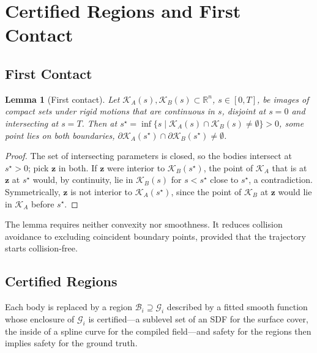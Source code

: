 \documentclass[journal]{IEEEtran}
\newtheorem{lemma}{Lemma}
\theoremstyle{definition}
\newcommand{\R}{\mathbb{R}}
\begin{document}
\section{Certified Regions and First Contact}\label{sec:regions}

\subsection{First Contact}
\begin{lemma}[First contact]\label{lem:contact}
Let $\mathcal K_A(s),\mathcal K_B(s)\subset\R^n$, $s\in[0,T]$, be images of compact sets under rigid
motions that are continuous in $s$, disjoint at $s=0$ and intersecting at $s=T$. Then at
$s^\star=\inf\{s\mid\mathcal K_A(s)\cap\mathcal K_B(s)\neq\emptyset\}>0$, some point lies on both
boundaries, $\partial\mathcal K_A(s^\star)\cap\partial\mathcal K_B(s^\star)\neq\emptyset$.
\end{lemma}
\begin{proof}
The set of intersecting parameters is closed, so the bodies intersect at $s^\star>0$; pick $\mathbf z$
in both. If $\mathbf z$ were interior to $\mathcal K_B(s^\star)$, the point of $\mathcal K_A$ that
is at $\mathbf z$ at $s^\star$ would, by continuity, lie in $\mathcal K_B(s)$ for $s<s^\star$ close
to $s^\star$, a contradiction. Symmetrically, $\mathbf z$ is not interior to $\mathcal K_A(s^\star)$,
since the point of $\mathcal K_B$ at $\mathbf z$ would lie in $\mathcal K_A$ before $s^\star$.
\end{proof}
The lemma requires neither convexity nor smoothness. It reduces collision avoidance to excluding
coincident boundary points, provided that the trajectory starts collision-free.

\subsection{Certified Regions}\label{sec:cert-body}
Each body is replaced by a region $\mathcal B_i\supseteq\mathcal G_i$ described by a fitted smooth
function whose enclosure of $\mathcal G_i$ is certified---a sublevel set of an SDF for the surface
cover, the inside of a spline curve for the compiled field---and safety for the regions then implies
safety for the ground truth.
\end{document}
